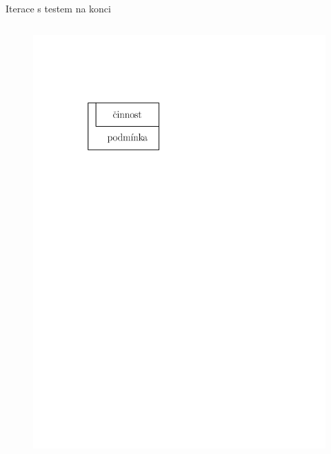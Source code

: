 \documentclass[11pt,aspectratio=169]{beamer}
\begin{document}
\begin{frame}{Iterace s testem na konci}
\begin{columns}
\begin{column}{.5\textwidth}
                \begin{figure}
                    \centering
                    \includegraphics[scale=.5]{../images/00-strukturogram-iterace-konec.pdf}
                \end{figure}
            \end{column}
        \end{columns}
    \end{frame}
\end{document}
